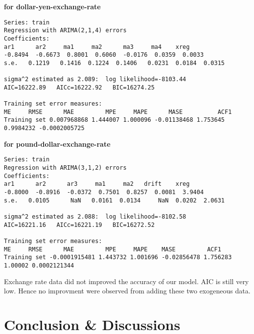 \documentclass[11pt,a4paper]{article}
\begin{document}
\scriptsize\textbf{for dollar-yen-exchange-rate}
\begin{verbatim}
Series: train 
Regression with ARIMA(2,1,4) errors 
Coefficients:
ar1      ar2     ma1     ma2      ma3     ma4    xreg
-0.8494  -0.6673  0.8001  0.6060  -0.0176  0.0359  0.0033
s.e.   0.1219   0.1416  0.1224  0.1406   0.0231  0.0184  0.0315

sigma^2 estimated as 2.089:  log likelihood=-8103.44
AIC=16222.89   AICc=16222.92   BIC=16274.25

Training set error measures:
ME     RMSE      MAE         MPE     MAPE      MASE          ACF1
Training set 0.007968868 1.444007 1.000096 -0.01138468 1.753645 0.9984232 -0.0002005725
\end{verbatim}
\textbf{for pound-dollar-exchange-rate}
\begin{verbatim}
Series: train 
Regression with ARIMA(3,1,2) errors 
Coefficients:
ar1      ar2      ar3     ma1     ma2   drift    xreg
-0.8000  -0.8916  -0.0372  0.7501  0.8257  0.0081  3.9404
s.e.   0.0105      NaN   0.0161  0.0134     NaN  0.0202  2.0631

sigma^2 estimated as 2.088:  log likelihood=-8102.58
AIC=16221.16   AICc=16221.19   BIC=16272.52

Training set error measures:
ME     RMSE      MAE         MPE     MAPE    MASE         ACF1
Training set -0.0001915481 1.443732 1.001696 -0.02856478 1.756283 1.00002 0.0002121344

\end{verbatim}
\normalsize
Exchange rate data did not improved the accuracy of our model. AIC is still very low. Hence no improvment were observed from adding these two exogeneous data.  
\section{Conclusion \& Discussions}
\end{document}
